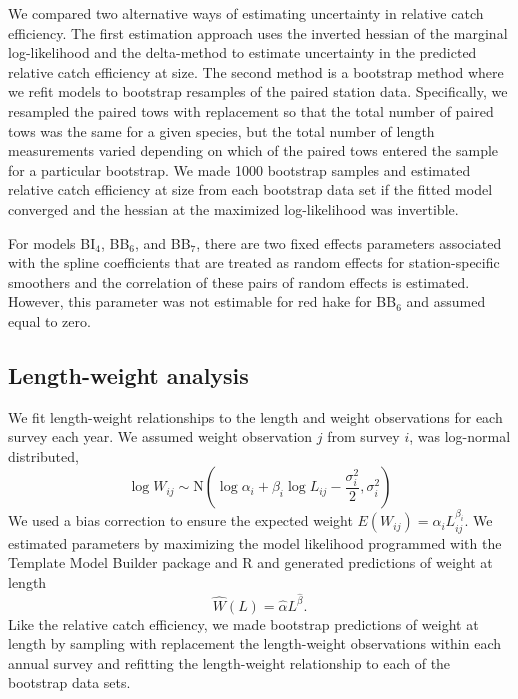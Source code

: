 \documentclass[
  12pt,
]{article}
\begin{document}
We compared two alternative ways of estimating uncertainty in relative
catch efficiency. The first estimation approach uses the inverted
hessian of the marginal log-likelihood and the delta-method to estimate
uncertainty in the predicted relative catch efficiency at size. The
second method is a bootstrap method where we refit models to bootstrap
resamples of the paired station data. Specifically, we resampled the
paired tows with replacement so that the total number of paired tows was
the same for a given species, but the total number of length
measurements varied depending on which of the paired tows entered the
sample for a particular bootstrap. We made 1000 bootstrap samples and
estimated relative catch efficiency at size from each bootstrap data set
if the fitted model converged and the hessian at the maximized
log-likelihood was invertible.

For models BI\(_4\), BB\(_6\), and BB\(_7\), there are two fixed effects
parameters associated with the spline coefficients that are treated as
random effects for station-specific smoothers and the correlation of
these pairs of random effects is estimated. However, this parameter was
not estimable for red hake for BB\(_6\) and assumed equal to zero.

\hypertarget{length-weight-analysis}{%
\subsection{Length-weight analysis}\label{length-weight-analysis}}

We fit length-weight relationships to the length and weight observations
for each survey each year. We assumed weight observation \(j\) from
survey \(i\), was log-normal distributed, \begin{equation}\label{wal}
 \log W_{ij} \sim \text{N}\left(\log \alpha_i + \beta_i \log L_{ij} - \frac{\sigma_i^2}{2}, \sigma_i^2\right)
\end{equation} We used a bias correction to ensure the expected weight
\(E(W_{ij})= \alpha_i L_{ij}^{\beta_i}\). We estimated parameters by
maximizing the model likelihood programmed with the Template Model
Builder package and R and generated predictions of weight at length
\begin{equation}\label{predwal}
\widehat W(L) = \widehat \alpha L^{\widehat \beta}.
\end{equation} Like the relative catch efficiency, we made bootstrap
predictions of weight at length by sampling with replacement the
length-weight observations within each annual survey and refitting the
length-weight relationship to each of the bootstrap data sets.
\end{document}
